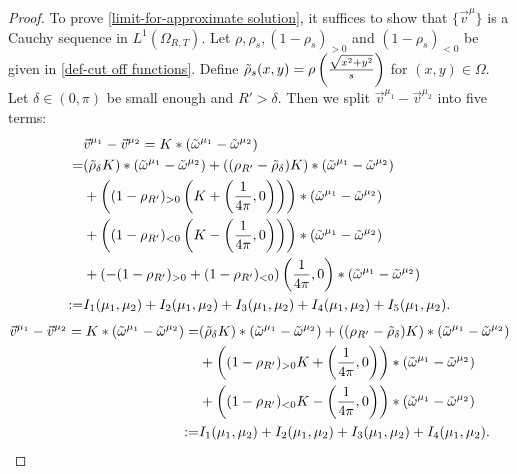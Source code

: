 \documentclass[1 [leqno, 11pt]{amsart}
\numberwithin{equation}{section}
\begin{document}
\begin{CJK*}{GBK}{song}
\begin{appendix}
\begin{proof}
To prove \eqref{limit-for-approximate solution}, it suffices to show that $\{\vec{v}^\mu\}$ is a Cauchy sequence in $L^1(\Omega_{R,T})$.
Let  $\rho,
 \rho_s,
(1-\rho_{s})_{>0}$ and
 $(1-\rho_{s})_{<0}$
be given in
\eqref{def-cut off functions}.
Define   $\tilde \rho_s(x,y)=\rho\left({\sqrt{x^2+y^2}\over s}\right)$ for $(x,y)\in \Omega$. Let $\delta\in(0,\pi)$ be small enough and $R'>\delta$. Then we split $\vec{v}^{\mu_1}-\vec{v}^{\mu_2}$ into five terms:
\begin{align}\nonumber
&\vec{v}^{\mu_1}-\vec{v}^{\mu_2}=K\ast(\tilde\omega^{\mu_1}-\tilde\omega^{\mu_2})\\\nonumber
=&
(\tilde\rho_\delta K)\ast(\tilde\omega^{\mu_1}-\tilde\omega^{\mu_2})+((\rho_{R'}-\tilde \rho_\delta)K)\ast(\tilde\omega^{\mu_1}-\tilde\omega^{\mu_2})\\\nonumber
&+\left((1-\rho_{R'})_{>0}\left(K+\left({1\over 4\pi},0\right)\right)\right)\ast(\tilde\omega^{\mu_1}-\tilde\omega^{\mu_2})\\\nonumber
&+\left((1-\rho_{R'})_{<0}\left(K-\left({1\over 4\pi},0\right)\right)\right)\ast(\tilde\omega^{\mu_1}-\tilde\omega^{\mu_2})\\\nonumber
&+\left(-(1-\rho_{R'})_{>0}+(1-\rho_{R'})_{<0}\right)\left({1\over 4\pi},0\right)\ast(\tilde\omega^{\mu_1}-\tilde\omega^{\mu_2})\\\label{vkappa1-vkappa2}
:=&I_1(\mu_1,\mu_2)+I_2(\mu_1,\mu_2)+I_3(\mu_1,\mu_2)+I_4(\mu_1,\mu_2)+I_5(\mu_1,\mu_2).
\end{align}
\begin{align}\label{vkappa1-vkappa2}
\vec{v}^{\mu_1}-\vec{v}^{\mu_2}=K\ast(\tilde\omega^{\mu_1}-\tilde\omega^{\mu_2})=&
(\tilde\rho_\delta K)\ast(\tilde\omega^{\mu_1}-\tilde\omega^{\mu_2})+((\rho_{R'}-\tilde \rho_\delta)K)\ast(\tilde\omega^{\mu_1}-\tilde\omega^{\mu_2})\\\nonumber
&+\left((1-\rho_{R'})_{>0}K+\left({1\over 4\pi},0\right)\right)\ast(\tilde\omega^{\mu_1}-\tilde\omega^{\mu_2})\\\nonumber
&+\left((1-\rho_{R'})_{<0}K-\left({1\over 4\pi},0\right)\right)\ast(\tilde\omega^{\mu_1}-\tilde\omega^{\mu_2})\\\nonumber
:=&I_1(\mu_1,\mu_2)+I_2(\mu_1,\mu_2)+I_3(\mu_1,\mu_2)+I_4(\mu_1,\mu_2).
\end{align}
\fi

\end{proof}
\end{appendix}
\end{CJK*}
\end{document}
